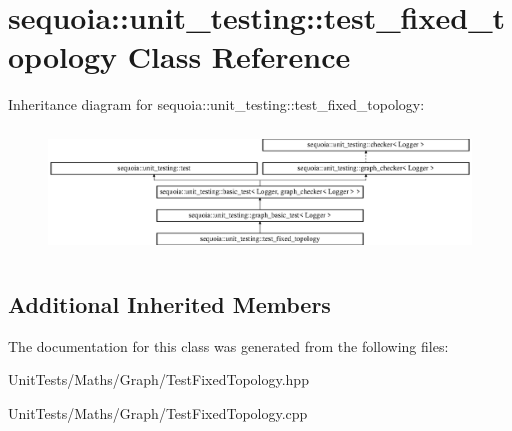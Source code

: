\hypertarget{classsequoia_1_1unit__testing_1_1test__fixed__topology}{}\section{sequoia\+::unit\+\_\+testing\+::test\+\_\+fixed\+\_\+topology Class Reference}
\label{classsequoia_1_1unit__testing_1_1test__fixed__topology}
Inheritance diagram for sequoia\+::unit\+\_\+testing\+::test\+\_\+fixed\+\_\+topology\+:\begin{figure}[H]
\begin{center}
\leavevmode
\includegraphics[height=3.357314cm]{classsequoia_1_1unit__testing_1_1test__fixed__topology}
\end{center}
\end{figure}
\subsection*{Additional Inherited Members}


The documentation for this class was generated from the following files\+:\begin{DoxyCompactItemize}
\item 
Unit\+Tests/\+Maths/\+Graph/Test\+Fixed\+Topology.\+hpp\item 
Unit\+Tests/\+Maths/\+Graph/Test\+Fixed\+Topology.\+cpp\end{DoxyCompactItemize}
